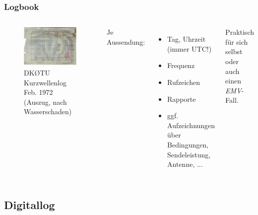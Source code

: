 \begin{frame}
  \frametitle{Logbook}

  \begin{columns}
    \begin{center}
      \begin{figure}
        \includegraphics[width=\textwidth,height=.8\textheight,keepaspectratio]{bv13/DK0TU_LOG_KW_1972-02_Auszug.jpg}
        \caption{DKØTU Kurzwellenlog Feb. 1972 (Auszug, nach Wasserschaden)}
      \end{figure}
    \end{center}

    Je Aussendung:

    \begin{itemize}
      \item Tag, Uhrzeit (immer UTC!)
      \item Frequenz
      \item Rufzeichen
      \item Rapporte
      \item ggf. Aufzeichnungen über Bedingungen, Sendeleistung, Antenne, ...
    \end{itemize}

    Praktisch für sich selbst oder auch einen \emph{EMV}-Fall.
  \end{columns}

\end{frame}

\subsection{Digitallog}

